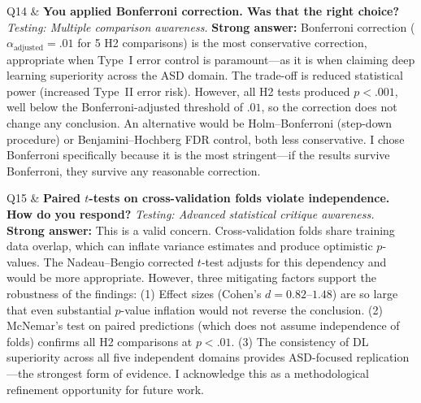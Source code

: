 \begin{xltabular}
Q14 & \textbf{You applied Bonferroni correction. Was that the right choice?} \newline
\textit{Testing: Multiple comparison awareness.} \newline\newline
\textbf{Strong answer:} Bonferroni correction ($\alpha_{\text{adjusted}} = .01$ for 5 H2 comparisons) is the most conservative correction, appropriate when Type~I error control is paramount---as it is when claiming deep learning superiority across the ASD domain. The trade-off is reduced statistical power (increased Type~II error risk). However, all H2 tests produced $p < .001$, well below the Bonferroni-adjusted threshold of $.01$, so the correction does not change any conclusion. An alternative would be Holm--Bonferroni (step-down procedure) or Benjamini--Hochberg FDR control, both less conservative. I chose Bonferroni specifically because it is the most stringent---if the results survive Bonferroni, they survive any reasonable correction. \\
\addlinespace

Q15 & \textbf{Paired $t$-tests on cross-validation folds violate independence. How do you respond?} \newline
\textit{Testing: Advanced statistical critique awareness.} \newline\newline
\textbf{Strong answer:} This is a valid concern. Cross-validation folds share training data overlap, which can inflate variance estimates and produce optimistic $p$-values. The Nadeau--Bengio corrected $t$-test adjusts for this dependency and would be more appropriate. However, three mitigating factors support the robustness of the findings: (1) Effect sizes (Cohen's $d = 0.82$--$1.48$) are so large that even substantial $p$-value inflation would not reverse the conclusion. (2) McNemar's test on paired predictions (which does not assume independence of folds) confirms all H2 comparisons at $p < .01$. (3) The consistency of DL superiority across all five independent domains provides ASD-focused replication---the strongest form of evidence. I acknowledge this as a methodological refinement opportunity for future work. \\
\addlinespace


\end{xltabular}

